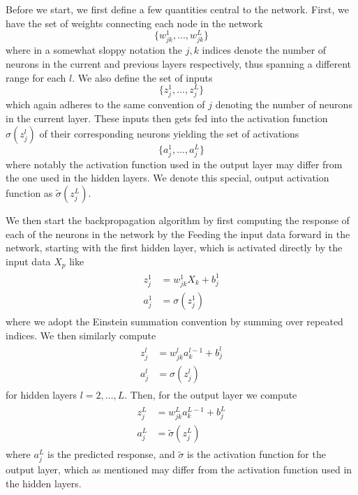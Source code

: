 \documentclass[reprint, english, nofootinbib]{revtex4-2}
\begin{document}
Before we start, we first define a few quantities central to the network. First, we have the set of weights connecting each node in the network
\begin{equation}
    \{w^{1}_{jk}, \dots, w_{jk}^L\}
\end{equation}
where in a somewhat sloppy notation the $j, k$ indices denote the number of neurons in the current and previous layers respectively, thus spanning a different range for each $l$. We also define the set of inputs
\begin{equation}
    \{z_j^1, \dots, z_j^L\}
\end{equation}
which again adheres to the same convention of $j$ denoting the number of neurons in the current layer. These inputs then gets fed into the activation function $\sigma(z_j^l)$ of their corresponding neurons yielding the set of activations
\begin{equation}
    \{a_j^1, \dots, a_j^L\}
\end{equation}
where notably the activation function used in the output layer may differ from the one used in the hidden layers. We denote this special, output activation function as $\tilde \sigma(z_j^L)$.

We then start the backpropagation algorithm by first computing the response of each of the neurons in the network by the Feeding the input data forward in the network, starting with the first hidden layer, which is activated directly by the input data $X_p$ like
\begin{align}\label{eqn: FeedForward Initial}
    \begin{split}
        z^1_j &= w^1_{jk}X_k + b^1_j \\
        a^1_j &= \sigma(z^1_j)
    \end{split}
\end{align}
where we adopt the Einstein summation convention by summing over repeated indices.
We then similarly compute
\begin{align}
    \begin{split}
        z^l_{j} &= w^l_{jk}a^{l-1}_k + b^l_j \\
        a^l_{j} &= \sigma(z^l_{j})
    \end{split}
\end{align}
for hidden layers $l = 2, \dots, L$. Then, for the output layer we compute
\begin{align}
    \begin{split}
        z^{L}_j &= w^{L}_{jk}a^{L-1}_k + b^{L}_j \\
        a^{L}_j &= \tilde\sigma(z^{L}_j)
    \end{split}
\end{align}
where $a^{L}_j$ is the predicted response, and $\tilde\sigma$ is the activation function for the output layer, which as mentioned may differ from the activation function used in the hidden layers.
\end{document}
